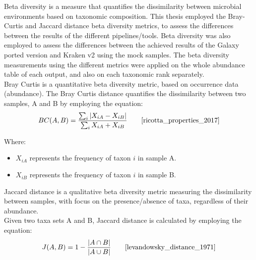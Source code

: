 Beta diversity is a measure that quantifies the dissimilarity between microbial environments based on taxonomic composition. This thesis employed the Bray-Curtis and Jaccard distance beta diversity metrics, to assess the differences between the results of the different pipelines/tools. Beta diversity was also employed to assess the differences between the achieved results of the Galaxy ported version and Kraken v2 using the mock samples. The beta diversity measurements using the different metrics were applied on the whole abundance table of each output, and also on each taxonomic rank separately.\\
Bray Curtis is a quantitative beta diversity metric, based on occurrence data (abundance). The Bray Curtis distance quantifies the dissimilarity between two samples, A and B by employing the equation:
\[
BC(A,B) = \frac{\sum_{i}^{} |X_{iA} - X_{iB}|}{\sum_{i}^{} X_{iA} + X_{iB}} \tag*{\cite{ricotta_properties_2017}}
\]

Where:
\begin{itemize}
    \item \(X_{iA}\) represents the frequency of taxon \(i\) in sample A.
    \item \(X_{iB}\) represents the frequency of taxon \(i\) in sample B.
\end{itemize}
Jaccard distance is a qualitative beta diversity metric measuring the dissimilarity between samples, with focus on the presence/absence of taxa, regardless of their abundance.\\ Given two taxa sets A and B, Jaccard distance is calculated by employing the equation:
\[
J(A,B) = 1 - \frac{|A \cap B|}{|A \cup B|} \tag*{\cite{levandowsky_distance_1971}}
\]